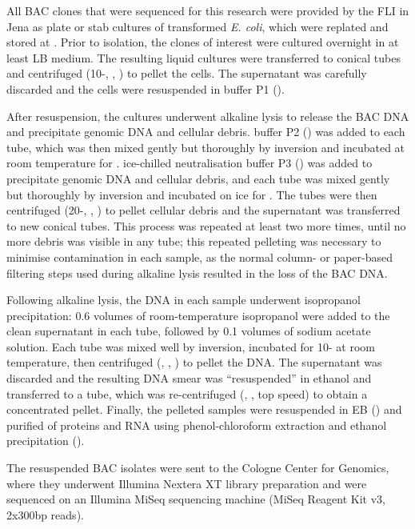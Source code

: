 All BAC clones that were sequenced for this research were provided by the FLI in Jena as plate or stab cultures of transformed \textit{E. coli}, which were replated and stored at . Prior to isolation, the clones of interest were cultured overnight in at least  LB medium. The resulting liquid cultures were transferred to  conical tubes and centrifuged (10-, , ) to pellet the cells. The supernatant was carefully discarded and the cells were resuspended in  buffer P1 ().

After resuspension, the cultures underwent alkaline lysis \parencite{birnboim1979alkalinelysis} to release the BAC DNA and precipitate genomic DNA and cellular debris.  buffer P2 () was added to each tube, which was then mixed gently but thoroughly by inversion and incubated at room temperature for .  ice-chilled neutralisation buffer P3 () was added to precipitate genomic DNA and cellular debris, and each tube was mixed gently but thoroughly by inversion and incubated on ice for . The tubes were then centrifuged (20-, , ) to pellet cellular debris and the supernatant was transferred to new conical tubes. This process was repeated at least two more times, until no more debris was visible in any tube; this repeated pelleting was necessary to minimise contamination in each sample, as the normal column- or paper-based filtering steps used during alkaline lysis resulted in the loss of the BAC DNA.

Following alkaline lysis, the DNA in each sample underwent isopropanol precipitation: 0.6 volumes of room-temperature isopropanol were added to the clean supernatant in each tube, followed by 0.1 volumes of  sodium acetate solution. Each tube was mixed well by inversion, incubated for 10- at room temperature, then centrifuged (, , ) to pellet the DNA. The supernatant was discarded and the resulting DNA smear was ``resuspended'' in   ethanol and transferred to a  tube, which was re-centrifuged (, , top speed) to obtain a concentrated pellet. Finally, the pelleted samples were resuspended in EB () and purified of proteins and RNA using phenol-chloroform extraction and ethanol precipitation ().

The resuspended BAC isolates were sent to the Cologne Center for Genomics, where they underwent Illumina Nextera XT library preparation and were sequenced on an Illumina MiSeq sequencing machine (MiSeq Reagent Kit v3, 2x300bp reads).

